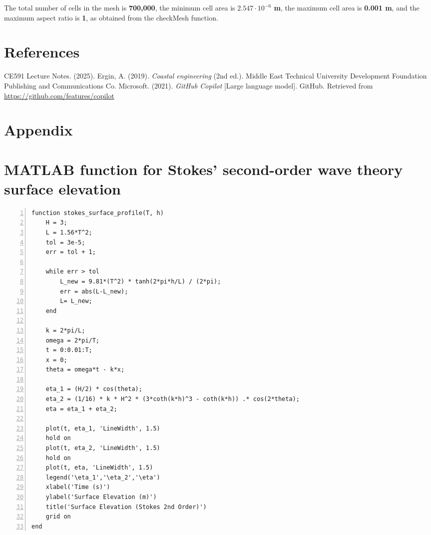 \documentclass[a4paper]{article}
\begin{document}
\vspace{0.3cm}

The total number of cells in the mesh is \textbf{700,000}, the minimum cell area is \textbf{$2.547 \cdot 10^{-6}$ m}, the maximum cell area is \textbf{0.001 m}, and the maximum aspect ratio is \textbf{1}, as obtained from the checkMesh function.

\newpage
\renewcommand{\refname}{}
\section{References}
\vspace{-1cm}
\begin{thebibliography}{99}
     CE591 Lecture Notes. (2025). 
     Ergin, A. (2019). \textit{Coastal engineering} (2nd ed.). Middle East Technical University Development Foundation Publishing and Communications Co.
     Microsoft. (2021). \textit{GitHub Copilot} [Large language model]. GitHub. Retrieved from \url{https://github.com/features/copilot}
\end{thebibliography}

\newpage
\appendix

\section{Appendix}

\section*{\small MATLAB function for Stokes' second-order wave theory surface elevation}
\begin{lstlisting}[frame=single, numbers=left, style=Matlab-Pyglike]
function stokes_surface_profile(T, h)
    H = 3;
    L = 1.56*T^2; 
    tol = 3e-5;
    err = tol + 1;

    while err > tol
        L_new = 9.81*(T^2) * tanh(2*pi*h/L) / (2*pi);
        err = abs(L-L_new);
        L= L_new;
    end

    k = 2*pi/L;
    omega = 2*pi/T;
    t = 0:0.01:T;
    x = 0;
    theta = omega*t - k*x;

    eta_1 = (H/2) * cos(theta);
    eta_2 = (1/16) * k * H^2 * (3*coth(k*h)^3 - coth(k*h)) .* cos(2*theta);
    eta = eta_1 + eta_2;

    plot(t, eta_1, 'LineWidth', 1.5)
    hold on
    plot(t, eta_2, 'LineWidth', 1.5)
    hold on
    plot(t, eta, 'LineWidth', 1.5)
    legend('\eta_1','\eta_2','\eta')
    xlabel('Time (s)')
    ylabel('Surface Elevation (m)')
    title('Surface Elevation (Stokes 2nd Order)')
    grid on
end
\end{lstlisting}
\newpage
\end{document}
